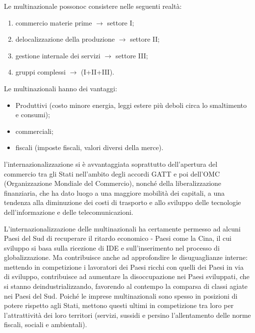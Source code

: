 \documentclass[a4paper]{article}
\begin{document}

Le multinazionale possonoc consistere nelle seguenti realtà:
\begin{enumerate}
    \item commercio materie prime \(\rightarrow\) settore I;
    \item delocalizzazione della produzione \(\rightarrow\) settore II;
    \item gestione internale dei servizi \(\rightarrow\) settore III;
    \item gruppi complessi \(\rightarrow\) (I+II+III).
\end{enumerate}

Le multinazionali hanno dei vantaggi:
\begin{itemize}
    \item Produttivi (costo minore energia, leggi estere più deboli circa lo smaltimento e consumi);
    \item commerciali;
    \item fiscali (imposte fiscali, valori diversi della merce).
\end{itemize}

l'internazionalizzazione si è avvantaggiata
soprattutto dell'apertura del commercio tra gli Stati nell'ambito degli accordi GATT
e poi dell'OMC (Organizzazione Mondiale del Commercio),
nonché della liberalizzazione finanziaria, che ha dato luogo a una maggiore mobilità dei capitali, a
una tendenza alla diminuzione dei costi di trasporto e allo sviluppo delle tecnologie
dell'informazione e delle telecomunicazioni.

L'internazionalizzazione delle multinazionali ha certamente permesso ad alcuni Paesi del Sud di
recuperare il ritardo economico - Paesi come la Cina, il cui sviluppo si basa sulla ricezione di IDE e
sull'inserimento nel processo di globalizzazione. Ma contribuisce anche ad approfondire le
disuguaglianze interne: mettendo in competizione i lavoratori dei Paesi ricchi con quelli dei Paesi
in via di sviluppo, contribuisce ad aumentare la disoccupazione nei Paesi sviluppati, che si stanno
deindustrializzando, favorendo al contempo la comparsa di classi agiate nei Paesi del Sud. Poiché
le imprese multinazionali sono spesso in posizioni di potere rispetto agli Stati, mettono questi
ultimi in competizione tra loro per l'attrattività dei loro territori (servizi, sussidi e persino
l'allentamento delle norme fiscali, sociali e ambientali).
\end{document}
